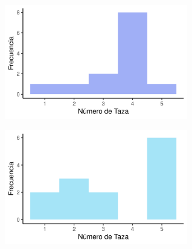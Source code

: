 \begin{figure}[H]
\begin{subfigure}[b]{8cm}
        \caption{}
    \end{subfigure}
    \begin{subfigure}[b]{8cm}
        \includegraphics[width=8cm]{Graphics/problema06_4.png}
        \caption{}
    \end{subfigure}
    \begin{subfigure}[b]{8cm}
        \includegraphics[width=8cm]{Graphics/problema06_5.png}
        \caption{}
    \end{subfigure}
\end{figure}
